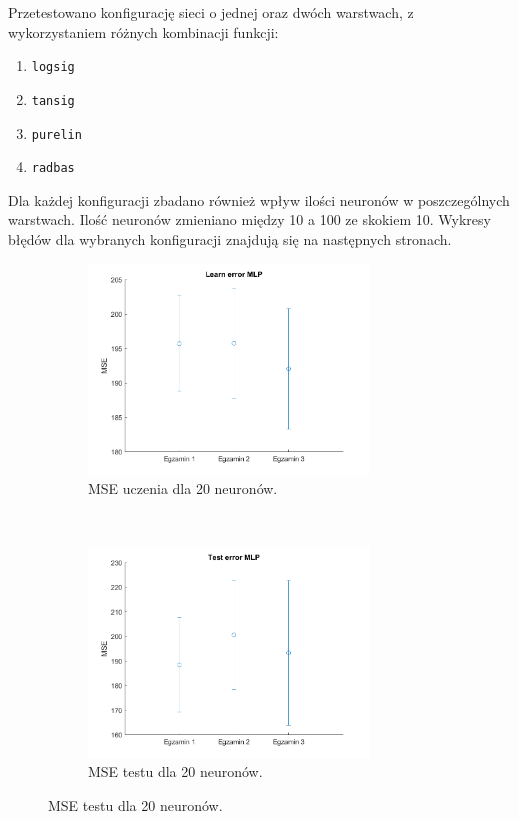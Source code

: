 \documentclass[12pt]{article}
\begin{document}
Przetestowano konfigurację sieci o jednej oraz dwóch warstwach, z wykorzystaniem różnych kombinacji funkcji:
\begin{enumerate}
\item \verb+logsig+
\item \verb+tansig+
\item \verb+purelin+
\item \verb+radbas+
\end{enumerate}
Dla każdej konfiguracji zbadano również wpływ ilości neuronów w poszczególnych warstwach. Ilość neuronów zmieniano między  10 a 100 ze skokiem 10. Wykresy błędów dla wybranych konfiguracji znajdują się na następnych stronach.


\begin{figure}[H]
\centering
\begin{subfigure}[t]{0.48\textwidth} 
\centering
\includegraphics[height=2.2in]{purelin_purelin_20_learn.png}
\caption{MSE uczenia dla 20 neuronów.}
\end{subfigure}
~~
\begin{subfigure}[t]{0.48\textwidth} 
\centering
\includegraphics[height=2.2in]{purelin_purelin_20_test.png}
\caption{MSE testu dla 20 neuronów.}
\end{subfigure}


\end{figure}
\end{document}
